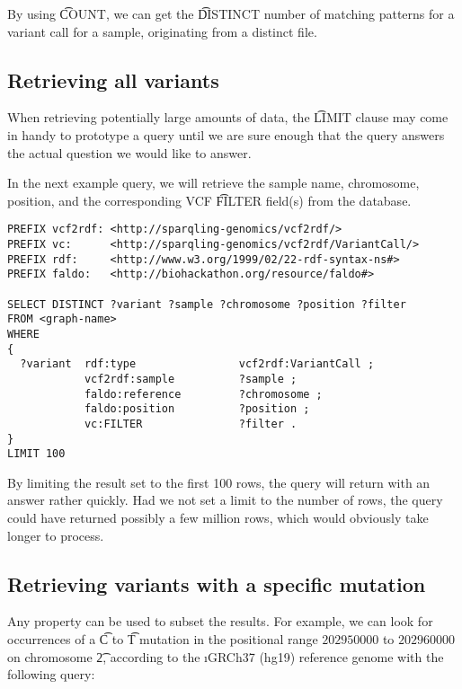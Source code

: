   By using \t{COUNT}, we can get the \t{DISTINCT} number of
  matching patterns for a variant call for a sample, originating from
  a distinct file.

\subsection{Retrieving all variants}

  When retrieving potentially large amounts of data, the \t{LIMIT}
  clause may come in handy to prototype a query until we are sure enough
  that the query answers the actual question we would like to answer.

  In the next example query, we will retrieve the sample name,
  chromosome, position, and the corresponding VCF \t{FILTER} field(s)
  from the database.

\begin{siderules}
\begin{verbatim}
PREFIX vcf2rdf: <http://sparqling-genomics/vcf2rdf/>
PREFIX vc:      <http://sparqling-genomics/vcf2rdf/VariantCall/>
PREFIX rdf:     <http://www.w3.org/1999/02/22-rdf-syntax-ns#>
PREFIX faldo:   <http://biohackathon.org/resource/faldo#>

SELECT DISTINCT ?variant ?sample ?chromosome ?position ?filter
FROM <graph-name>
WHERE
{
  ?variant  rdf:type                vcf2rdf:VariantCall ;
            vcf2rdf:sample          ?sample ;
            faldo:reference         ?chromosome ;
            faldo:position          ?position ;
            vc:FILTER               ?filter .
}
LIMIT 100
\end{verbatim}
\end{siderules}

  By limiting the result set to the first 100 rows, the query will return
  with an answer rather quickly.  Had we not set a limit to the number of
  rows, the query could have returned possibly a few million rows, which
  would obviously take longer to process.

\subsection{Retrieving variants with a specific mutation}

  Any property can be used to subset the results.  For example, we can
  look for occurrences of a \t{C} to \t{T} mutation in the positional
  range $202950000$ to $202960000$ on chromosome \t{2}, according to the
  \i{GRCh37 (hg19)} reference genome with the following query:

